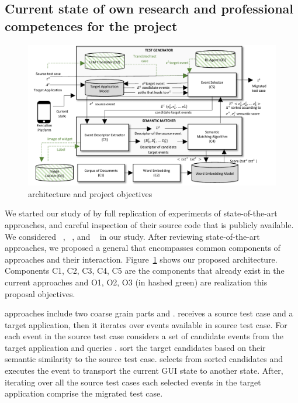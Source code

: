 	
\subsection{Current state of own research and professional competences for the project}

\begin{figure}[h]
	\centering
	\includegraphics[width=\textwidth]{images/architecture.pdf}
	\caption{\testreuse architecture and project objectives}
	\label{fig:architecture}
\end{figure}

We started our study of \testreuse  by full replication of experiments of state-of-the-art  \testreuse approaches, and careful inspection of their source code that is publicly available. 
We considered \craftdroid~\cite{lin:craftdroid:ASE:2019}, \atm~\cite{behrang:apptestmigrator:ASE:2019}, and \adaptdroid~\cite{Mariani:Adaptdroid:AST:2021} in our study.
After reviewing state-of-the-art approaches, we proposed a general \architecture that encompasses common components of \testreuse approaches and their interaction. 
Figure~\ref{fig:architecture} shows our proposed architecture.
Components C1, C2, C3, C4, C5 are the components that already exist in the current approaches and O1, O2, O3 (in hashed green) are realization this proposal objectives. 

\bigskip
\testreuse approaches include two coarse grain parts \generator and \matcher.
\generator receives a source test case  and a target application, then it iterates over events available in source test case. 
For each event in the source test case \generator considers a set of candidate events from the target application and queries \matcher.
\matcher sort the target candidates based on their semantic similarity to the source test case.
\generator selects from sorted candidates and executes the event to transport the current GUI state to another state. 
After, iterating over all the source test cases each selected events in the target application comprise the migrated test case.

